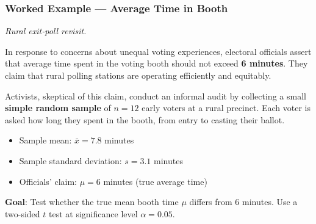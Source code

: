 \documentclass[handout]{beamer}
\begin{document}
\begin{frame}
\frametitle{Worked Example — Average Time in Booth}
\small
\textit{Rural exit‑poll revisit.}  

\vspace{0.5em}
In response to concerns about unequal voting experiences, electoral officials assert that average time spent in the voting booth should not exceed \textbf{6 minutes}. They claim that rural polling stations are operating efficiently and equitably.

\vspace{0.5em}
Activists, skeptical of this claim, conduct an informal audit by collecting a small \textbf{simple random sample} of \(n=12\) early voters at a rural precinct. Each voter is asked how long they spent in the booth, from entry to casting their ballot.

\vspace{0.5em}
\begin{itemize}
  \item Sample mean: \(\bar x = 7.8\) minutes  
  \item Sample standard deviation: \(s = 3.1\) minutes  
  \item Officials’ claim: \(\mu = 6\) minutes (true average time)
\end{itemize}

\vspace{0.5em}
\textbf{Goal}: Test whether the true mean booth time \(\mu\) differs from 6 minutes. Use a two-sided \(t\) test at significance level \(\alpha = 0.05\).
\end{frame}
\end{document}
